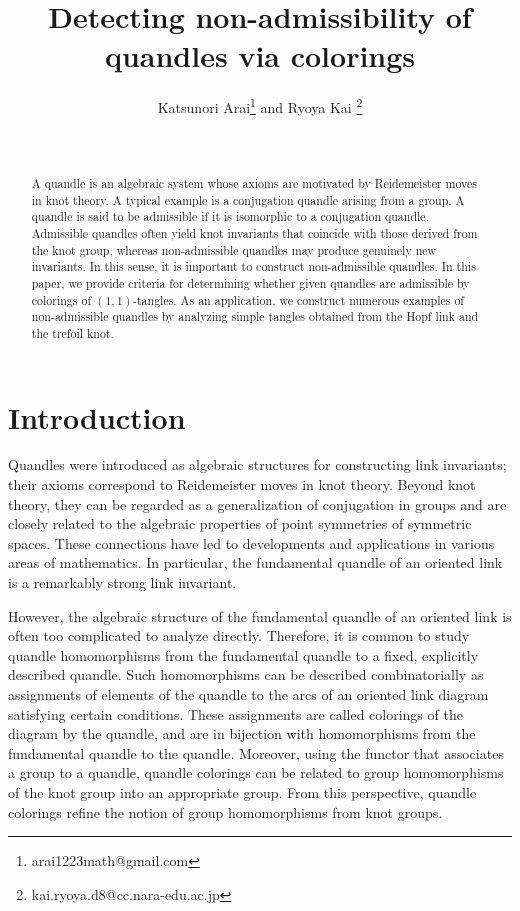 \documentclass[12pt]{article}
\title{Detecting non-admissibility of quandles via colorings}
\author{Katsunori Arai\footnote{arai1223math@gmail.com} and Ryoya Kai \footnote{kai.ryoya.d8@cc.nara-edu.ac.jp}}
\date{\ }
\theoremstyle{plain}
\theoremstyle{definition}
\begin{document}
\maketitle


\begin{abstract}
    A quandle is an algebraic system whose axioms are motivated by Reidemeister moves in knot theory.
    A typical example is a conjugation quandle 
    arising from a group.
    A quandle is said to be admissible if it is isomorphic to a conjugation quandle.
    Admissible quandles often yield knot invariants that coincide with those derived from the knot group, whereas non-admissible quandles may produce genuinely new invariants.
    In this sense,
    it is important to construct non-admissible quandles.
    In this paper, 
    we provide criteria for determining whether given quandles are admissible by colorings of $(1,1)$-tangles. 
    As an application, we construct numerous examples of non-admissible quandles by analyzing simple tangles obtained from the Hopf link and the trefoil knot.
\end{abstract}

\section{Introduction}

Quandles were introduced as algebraic structures for constructing link
invariants; their axioms correspond to Reidemeister moves in knot theory. 
Beyond knot theory, they can be regarded as a generalization of conjugation in groups and are closely related to the algebraic properties of point symmetries of symmetric spaces.
These connections have led to developments and applications in various areas of mathematics. 
In particular, the fundamental quandle of an oriented link is a remarkably strong link invariant. 

However, the algebraic structure of the fundamental quandle of an oriented link is often too complicated to analyze directly. 
Therefore, it is common to study quandle homomorphisms from the fundamental quandle to a fixed, explicitly described quandle. 
Such homomorphisms can be described combinatorially as assignments of elements of the quandle to the arcs of an oriented link diagram satisfying certain conditions. 
These assignments are called colorings of the diagram by the quandle, and are in bijection with homomorphisms from the fundamental quandle to the quandle. 
Moreover, using the functor that associates a group to a quandle, 
quandle colorings can be related to group homomorphisms of the knot group into an appropriate group. 
From this perspective, quandle colorings refine the notion of group homomorphisms from knot groups.
\end{document}
